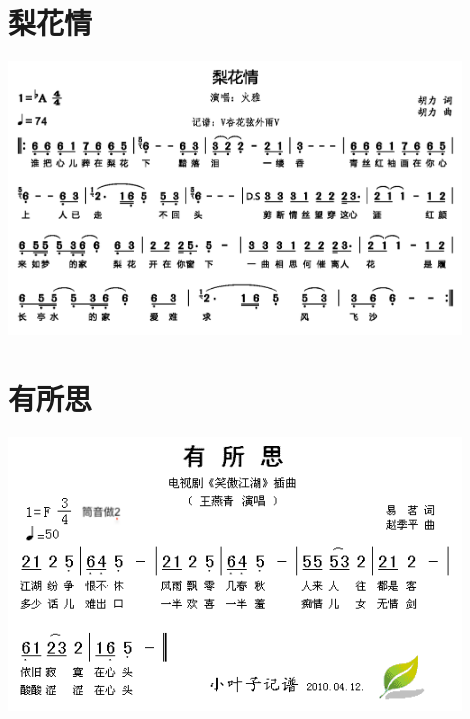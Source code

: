 \documentclass[cn,pad,twocol]{elegantbook}
\begin{document}
\section{梨花情} \includegraphics[width=0.9\textwidth]{rpi400/20210206梨花情.png}
\section{有所思}    \includegraphics[width=0.9\textwidth]{dongxiao/20200710-有所思}
\end{document}
